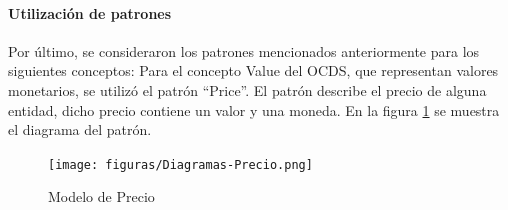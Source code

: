 \paragraph{Utilización de patrones}
Por último, se consideraron los patrones mencionados anteriormente para los siguientes conceptos:
Para el concepto Value del OCDS, que representan valores monetarios, se utilizó el patrón “Price”. El patrón describe el precio de alguna entidad, dicho precio contiene un valor y una moneda. En la figura \ref{img:Modelo de Precio} se muestra el diagrama del patrón.

\begin{figure}[h!]
    \centering
    \texttt{[image: figuras/Diagramas-Precio.png]}
    \caption{Modelo de Precio}
    \label{img:Modelo de Precio}
\end{figure}